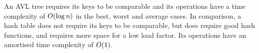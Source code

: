 An AVL tree requires its keys to be comparable and its operations have a time complexity of \( O\!\left(\log n\right) \) in the best, worst and average cases.
In comparison, a hash table does not require its keys to be comparable, but does require good hash functions, and requires more space for a low load factor.
Its operations have an amortised time complexity of \( O\!\left(1\right) \).
